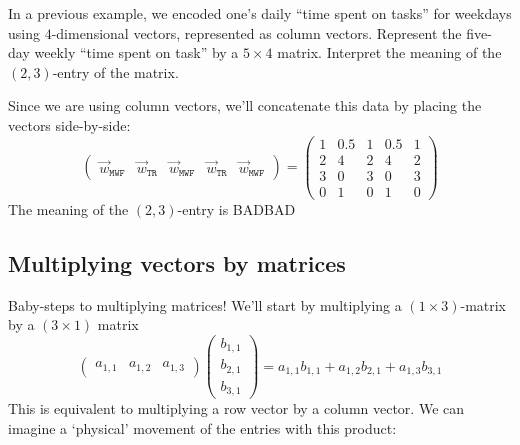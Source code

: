 \documentclass{ximera}
\begin{document}
\begin{example}
  In a previous example, we encoded one's daily ``time spent on
  tasks'' for weekdays using $4$-dimensional vectors, represented as
  column vectors. Represent the five-day weekly ``time spent on task''
  by a $5\times 4$ matrix. Interpret the meaning of the $(2,3)$-entry
  of the matrix.
  \begin{explanation}
    Since we are using column vectors, we'll concatenate this data by
    placing the vectors side-by-side:
    \[
    \begin{pmatrix}
      \vec{w}_{\texttt{MWF}} & \vec{w}_{\texttt{TR}} & \vec{w}_{\texttt{MWF}} & \vec{w}_{\texttt{TR}} & \vec{w}_{\texttt{MWF}}
    \end{pmatrix}
    =
    \begin{pmatrix}
      1 & 0.5 & 1 & 0.5 & 1 \\
      2 & 4   & 2 & 4   & 2 \\
      3 & 0   & 3 & 0   & 3 \\
      0 & 1   & 0 & 1   & 0
    \end{pmatrix}
    \]
    The meaning of the $(2,3)$-entry is BADBAD
  \end{explanation}
\end{example}







\subsection{Multiplying vectors by matrices}

Baby-steps to multiplying matrices! We'll start by multiplying a $(1\times 3)$-matrix by a $(3\times 1)$ matrix
\[
\begin{pmatrix} a_{1,1} & a_{1,2} & a_{1,3} \end{pmatrix}
\begin{pmatrix} b_{1,1} \\ b_{2,1} \\ b_{3,1} \end{pmatrix} = a_{1,1}b_{1,1} + a_{1,2}b_{2,1} + a_{1,3}b_{3,1}
\]
This is equivalent to multiplying a row vector by a column vector. We
can imagine a `physical' movement of the entries with this product:
\end{document}
